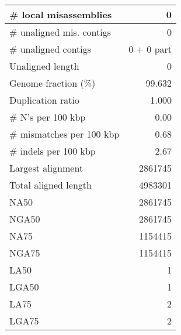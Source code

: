 \documentclass[12pt,a4paper]{article}
\begin{document}
\begin{table}[ht]
\begin{center}
\begin{tabular}{|l*{1}{|r}|}
\# local misassemblies & 0 \\ \hline
\# unaligned mis. contigs & 0 \\ \hline
\# unaligned contigs & 0 + 0 part \\ \hline
Unaligned length & 0 \\ \hline
Genome fraction (\%) & 99.632 \\ \hline
Duplication ratio & 1.000 \\ \hline
\# N's per 100 kbp & 0.00 \\ \hline
\# mismatches per 100 kbp & 0.68 \\ \hline
\# indels per 100 kbp & 2.67 \\ \hline
Largest alignment & 2861745 \\ \hline
Total aligned length & 4983301 \\ \hline
NA50 & 2861745 \\ \hline
NGA50 & 2861745 \\ \hline
NA75 & 1154415 \\ \hline
NGA75 & 1154415 \\ \hline
LA50 & 1 \\ \hline
LGA50 & 1 \\ \hline
LA75 & 2 \\ \hline
LGA75 & 2 \\ \hline
\end{tabular}
\end{center}
\end{table}
\end{document}
